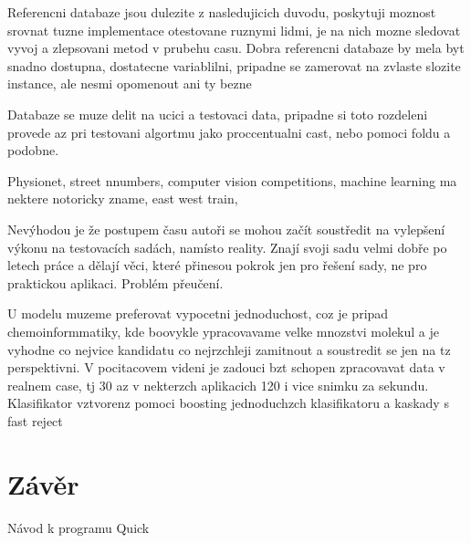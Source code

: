 \documentclass[10pt,draft,oneside]{fithesis2}
\begin{document}
Referencni databaze jsou dulezite z nasledujicich duvodu, poskytuji moznost srovnat tuzne implementace otestovane ruznymi lidmi, je na nich mozne sledovat vyvoj a zlepsovani metod v prubehu casu. Dobra referencni databaze by mela byt snadno dostupna, dostatecne variablilni, pripadne se zamerovat na zvlaste slozite instance, ale nesmi opomenout ani ty bezne

Databaze se muze delit na ucici a testovaci data, pripadne si toto rozdeleni provede az pri testovani algortmu jako proccentualni cast, nebo pomoci foldu a podobne.

Physionet, street nnumbers, computer vision competitions, machine learning ma nektere notoricky zname, east west train,

Nevýhodou je že postupem času autoři se mohou začít soustředit na vylepšení výkonu na testovacích sadách, namísto reality. Znají svoji sadu velmi dobře po letech práce a dělají věci, které přinesou pokrok jen pro řešení sady, ne pro praktickou aplikaci. Problém přeučení.

U modelu muzeme preferovat vypocetni jednoduchost, coz je pripad chemoinformmatiky, kde boovykle ypracovavame velke mnozstvi molekul a je vyhodne co nejvice kandidatu co nejrzchleji zamitnout a soustredit se jen na tz perspektivni. V pocitacovem videni je zadouci bzt schopen zpracovavat data v realnem case, tj 30 az v nekterzch aplikacich 120 i vice snimku za sekundu. Klasifikator vztvorenz pomoci boosting jednoduchzch klasifikatoru a kaskady s fast reject

\chapter{Závěr}


%



\appendix

Návod k programu Quick

\end{document}
